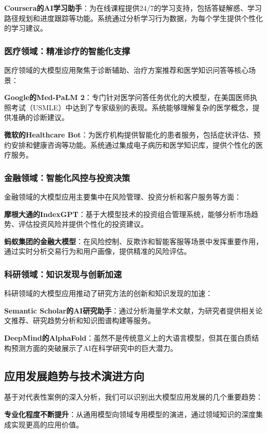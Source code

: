\documentclass{article}
\begin{document}
\textbf{Coursera的AI学习助手}：为在线课程提供24/7的学习支持，包括答疑解惑、学习路径规划和进度跟踪等功能。系统通过分析学习行为数据，为每个学生提供个性化的学习建议。

\subsubsection{医疗领域：精准诊疗的智能化支撑}
医疗领域的大模型应用聚焦于诊断辅助、治疗方案推荐和医学知识问答等核心场景：

\textbf{Google的Med-PaLM 2}：专门针对医学问答任务优化的大模型，在美国医师执照考试（USMLE）中达到了专家级别的表现。系统能够理解复杂的医学概念，提供准确的诊断建议。

\textbf{微软的Healthcare Bot}：为医疗机构提供智能化的患者服务，包括症状评估、预约安排和健康咨询等功能。系统通过集成电子病历和医学知识库，提供个性化的医疗服务。

\subsubsection{金融领域：智能化风控与投资决策}
金融领域的大模型应用主要集中在风险管理、投资分析和客户服务等方面：

\textbf{摩根大通的IndexGPT}：基于大模型技术的投资组合管理系统，能够分析市场趋势、评估投资风险并提供个性化的投资建议。

\textbf{蚂蚁集团的金融大模型}：在风险控制、反欺诈和智能客服等场景中发挥重要作用，通过实时分析交易行为和用户画像，提供精准的风险评估。

\subsubsection{科研领域：知识发现与创新加速}
科研领域的大模型应用推动了研究方法的创新和知识发现的加速：

\textbf{Semantic Scholar的AI研究助手}：通过分析海量学术文献，为研究者提供相关论文推荐、研究趋势分析和知识图谱构建等服务。

\textbf{DeepMind的AlphaFold}：虽然不是传统意义上的大语言模型，但其在蛋白质结构预测方面的突破展示了AI在科学研究中的巨大潜力。

\subsection{应用发展趋势与技术演进方向}
基于对代表性案例的深入分析，我们可以识别出大模型应用发展的几个重要趋势：

\textbf{专业化程度不断提升}：从通用模型向领域专用模型的演进，通过领域知识的深度集成实现更高的应用价值。
\end{document}
